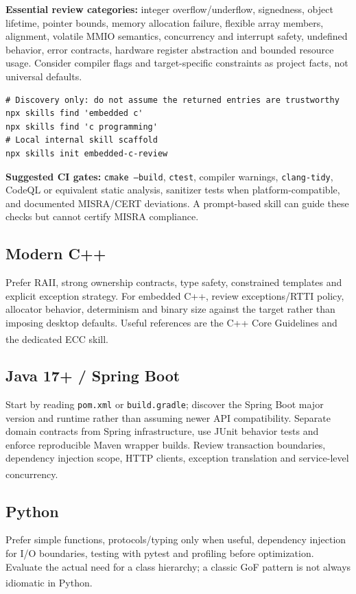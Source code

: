 \documentclass[11pt,letterpaper]{article}
\newcommand{\src}[1]{\textsuperscript{\textcolor{teal}{\cite{#1}}}}
\begin{document}
\textbf{Essential review categories:} integer overflow/underflow, signedness, object lifetime, pointer bounds, memory allocation failure, flexible array members, alignment, volatile MMIO semantics, concurrency and interrupt safety, undefined behavior, error contracts, hardware register abstraction and bounded resource usage. Consider compiler flags and target-specific constraints as project facts, not universal defaults.
\begin{verbatim}
# Discovery only: do not assume the returned entries are trustworthy
npx skills find 'embedded c'
npx skills find 'c programming'
# Local internal skill scaffold
npx skills init embedded-c-review
\end{verbatim}
\textbf{Suggested CI gates:} \texttt{cmake --build}, \texttt{ctest}, compiler warnings, \texttt{clang-tidy}, CodeQL or equivalent static analysis, sanitizer tests when platform-compatible, and documented MISRA/CERT deviations. A prompt-based skill can guide these checks but cannot certify MISRA compliance.

\subsection{Modern C++}
Prefer RAII, strong ownership contracts, type safety, constrained templates and explicit exception strategy. For embedded C++, review exceptions/RTTI policy, allocator behavior, determinism and binary size against the target rather than imposing desktop defaults. Useful references are the C++ Core Guidelines and the dedicated ECC skill.\src{cppcore,cppskill}

\subsection{Java 17+ / Spring Boot}
Start by reading \texttt{pom.xml} or \texttt{build.gradle}; discover the Spring Boot major version and runtime rather than assuming newer API compatibility. Separate domain contracts from Spring infrastructure, use JUnit behavior tests and enforce reproducible Maven wrapper builds. Review transaction boundaries, dependency injection scope, HTTP clients, exception translation and service-level concurrency.\src{javaspring,javajunit}

\subsection{Python}
Prefer simple functions, protocols/typing only when useful, dependency injection for I/O boundaries, testing with pytest and profiling before optimization. Evaluate the actual need for a class hierarchy; a classic GoF pattern is not always idiomatic in Python.\src{wshobsonfile,pythonpatterns}
\end{document}
